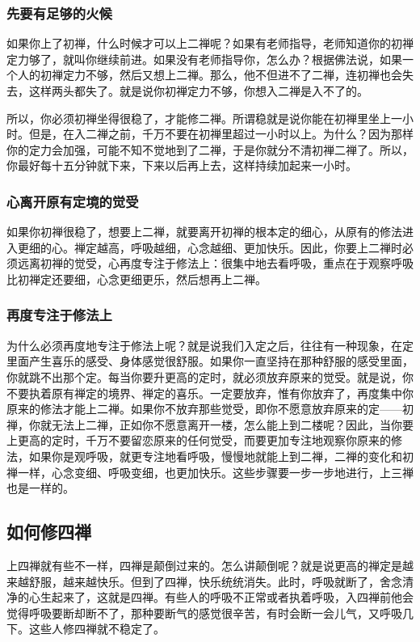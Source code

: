\documentclass{book}
\begin{document}
\subsubsection{先要有足够的火候}

如果你上了初禅，什么时候才可以上二禅呢？如果有老师指导，老师知道你的初禅定力够了，就叫你继续前进。如果没有老师指导你，怎么办？根据佛法说，如果一个人的初禅定力不够，然后又想上二禅。那么，他不但进不了二禅，连初禅也会失去，这样两头都失了。就是说你初禅定力不够，你想入二禅是入不了的。

所以，你必须初禅坐得很稳了，才能修二禅。所谓稳就是说你能在初禅里坐上一小时。但是，在入二禅之前，千万不要在初禅里超过一小时以上。为什么？因为那样你的定力会加强，可能不知不觉地到了二禅，于是你就分不清初禅二禅了。所以，你最好每十五分钟就下来，下来以后再上去，这样持续加起来一小时。

\subsubsection{心离开原有定境的觉受}

如果你初禅很稳了，想要上二禅，就要离开初禅的根本定的细心，从原有的修法进入更细的心。禅定越高，呼吸越细，心念越细、更加快乐。因此，你要上二禅时必须远离初禅的觉受，心再度专注于修法上：很集中地去看呼吸，重点在于观察呼吸比初禅定还要细，心念更细更乐，然后想再上二禅。

\subsubsection{再度专注于修法上}

为什么必须再度地专注于修法上呢？就是说我们入定之后，往往有一种现象，在定里面产生喜乐的感受、身体感觉很舒服。如果你一直坚持在那种舒服的感受里面，你就跳不出那个定。每当你要升更高的定时，就必须放弃原来的觉受。就是说，你不要执着原有禅定的境界、禅定的喜乐。一定要放弃，惟有你放弃了，再度集中你原来的修法才能上二禅。如果你不放弃那些觉受，即你不愿意放弃原来的定——初禅，你就无法上二禅，正如你不愿意离开一楼，怎么能上到二楼呢？因此，当你要上更高的定时，千万不要留恋原来的任何觉受，而要更加专注地观察你原来的修法，如果你是观呼吸，就更专注地看呼吸，慢慢地就能上到二禅，二禅的变化和初禅一样，心念变细、呼吸变细，也更加快乐。这些步骤要一步一步地进行，上三禅也是一样的。

\subsection{如何修四禅}

上四禅就有些不一样，四禅是颠倒过来的。怎么讲颠倒呢？就是说更高的禅定是越来越舒服，越来越快乐。但到了四禅，快乐统统消失。此时，呼吸就断了，舍念清净的心生起来了，这就是四禅。有些人的呼吸不正常或者执着呼吸，入四禅前他会觉得呼吸要断却断不了，那种要断气的感觉很辛苦，有时会断一会儿气，又呼吸几下。这些人修四禅就不稳定了。
\end{document}

